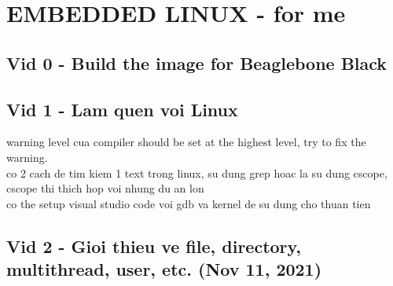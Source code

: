 
\section{EMBEDDED LINUX - for me}


\subsection{Vid 0 - Build the image for Beaglebone Black}


\subsection{Vid 1 - Lam quen voi Linux}

warning level cua compiler should be set at the highest level, try to fix the warning.
\\co 2 cach de tim kiem 1 text trong linux, su dung grep hoac la su dung cscope, cscope thi thich hop voi nhung du an lon
\\co the setup visual studio code voi gdb va kernel de su dung cho thuan tien


\subsection{Vid 2 - Gioi thieu ve file, directory, multithread, user, etc. (Nov 11, 2021)}

